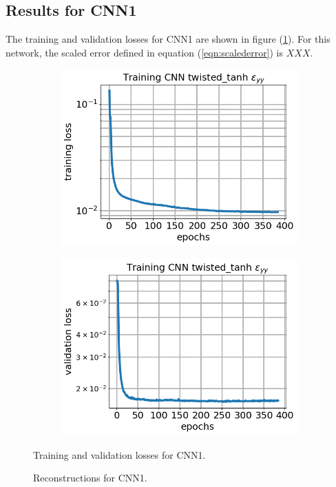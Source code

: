 \documentclass[12pt]{article}
\begin{document}
\subsection{\label{sect:resultscnn1}Results for CNN1}
%
The training and validation losses for CNN1 are shown in figure (\ref{fig:cnn1losses}). For this network, the scaled error defined in equation (\ref{eqn:scalederror}) is $XXX$.
\begin{figure}[h]
  \centering
  \begin{subfigure}[c]{0.45\linewidth}
    \includegraphics[totalheight=4cm]{Figures/Results1/loss.png}
  \end{subfigure}
%  
  \begin{subfigure}[c]{0.45\linewidth}
    \includegraphics[totalheight=4cm]{Figures/Results1/val_loss.png}
  \end{subfigure}
  \caption{\label{fig:cnn1losses} Training and validation losses for CNN1.}
\end{figure}
%
\begin{figure}[h]
  \centering
  \begin{subfigure}[c]{0.23\linewidth}
  \end{subfigure}
  \caption{Reconstructions for CNN1.}
\end{figure}
% 
\end{document}
